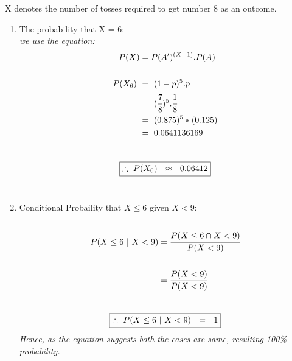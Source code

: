 \documentclass{article}
\begin{document}
\begin{enumerate}
\textnormal{X denotes the number of tosses required to get number 8 as an outcome.}\\
\begin{enumerate}
    \item \textnormal{The probability that X = 6:}\\
    \textit{we use the equation:}
    \begin{align*}
      P(X) & = P(A')^{(X-1)}.P(A)\\\\
      P(X_6)\  & =\  (1-p)^{5}.p\\
      & =\ (\cfrac{7}{8})^{5}.\cfrac{1}{8}\\
      & =\ (0.875)^{5}*(0.125)\\
      & =\ 0.0641136169
    \end{align*}\\
    \[
     \boxed{\therefore\ P(X_6)\ \ \approx \ \ 0.06412}\\
    \]\\
    \item \textnormal{Conditional Probaility that $X \leq 6$ given $X < 9$:}\\\\
    \begin{align*}
      P(X\leq 6 \ | \ X < 9) & = \cfrac{P(X\leq 6 \cap X < 9)}{P(X < 9)}\\\\
      & = \cfrac{P(X < 9)}{P(X < 9)}
    \end{align*}\\
    \[
     \boxed{\therefore\ P(X\leq 6 \ | \ X < 9)\ \ = \ \ 1}\\
    \]
    \textit{Hence, as the equation suggests both the cases are same, resulting 100\% probability.}\\\\

  \end{enumerate}
\end{enumerate}
\end{document}

